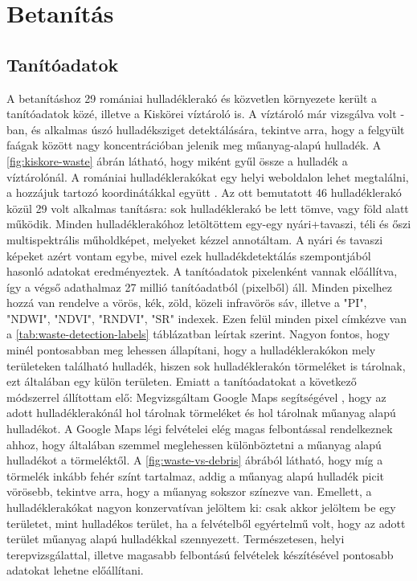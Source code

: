 \chapter{Betanítás}
\label{ch:training}

\section{Tanítóadatok}

A betanításhoz 29 romániai hulladéklerakó és közvetlen környezete került a tanítóadatok közé, illetve a Kiskörei víztároló is. A víztároló már vizsgálva volt \cite{magyar2023}-ban, és alkalmas úszó hulladéksziget detektálására, tekintve arra, hogy a felgyült faágak között nagy koncentrációban jelenik meg műanyag-alapú hulladék. A \ref{fig:kiskore-waste} ábrán látható, hogy miként gyűl össze a hulladék a víztárolónál. A romániai hulladéklerakókat egy helyi weboldalon lehet megtalálni, a hozzájuk tartozó koordinátákkal együtt \cite{wasteromania2019}. Az ott bemutatott 46 hulladéklerakó közül 29 volt alkalmas tanításra: sok hulladéklerakó be lett tömve, vagy föld alatt működik. Minden hulladéklerakóhoz letöltöttem egy-egy nyári+tavaszi, téli és őszi multispektrális műholdképet, melyeket kézzel annotáltam. A nyári és tavaszi képeket azért vontam egybe, mivel ezek hulladékdetektálás szempontjából hasonló adatokat eredményeztek. A tanítóadatok pixelenként vannak előállítva, így a végső adathalmaz 27 millió tanítóadatból (pixelből) áll. Minden pixelhez hozzá van rendelve a vörös, kék, zöld, közeli infravörös sáv, illetve a "PI", "NDWI", "NDVI", "RNDVI", "SR" indexek. Ezen felül minden pixel címkézve van a \ref{tab:waste-detection-labels} táblázatban leírtak szerint. Nagyon fontos, hogy minél pontosabban meg lehessen állapítani, hogy a hulladéklerakókon mely területeken található hulladék, hiszen sok hulladéklerakón törmeléket is tárolnak, ezt általában egy külön területen. Emiatt a tanítóadatokat a következő módszerrel állítottam elő: Megvizsgáltam Google Maps segítségével \cite{googlemaps2024}, hogy az adott hulladéklerakónál hol tárolnak törmeléket és hol tárolnak műanyag alapú hulladékot. A Google Maps légi felvételei elég magas felbontással rendelkeznek ahhoz, hogy általában szemmel meglehessen különböztetni a műanyag alapú hulladékot a törmeléktől. A \ref{fig:waste-vs-debris} ábrából látható, hogy míg a törmelék inkább fehér színt tartalmaz, addig a műanyag alapú hulladék picit vörösebb, tekintve arra, hogy a műanyag sokszor színezve van. Emellett, a hulladéklerakókat nagyon konzervatívan jelöltem ki: csak akkor jelöltem be egy területet, mint hulladékos terület, ha a felvételből egyértelmű volt, hogy az adott terület műanyag alapú hulladékkal szennyezett. Természetesen, helyi terepvizsgálattal, illetve magasabb felbontású felvételek készítésével pontosabb adatokat lehetne előállítani. 

